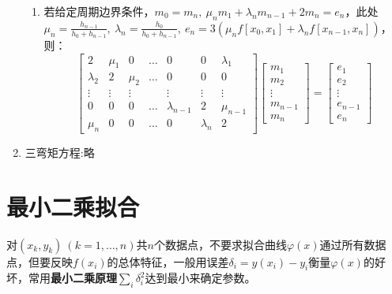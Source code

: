 \begin{enumerate}
\begin{enumerate}
	\item 若给定周期边界条件，$m_0 = m_n,\  \mu_n m_1 + \lambda_n m_{n-1} + 2m_n = e_n$，此处$\mu_n = \frac{h_{n-1}}{h_0 + h_{n-1}},\ \lambda_n = \frac{h_0}{h_0+h_{n-1}},\ e_n = 3(\mu_n f[x_0,x_1] + \lambda_n f[x_{n-1},x_n])$，则：
		\begin{equation}
			\begin{bmatrix}
			2 &\mu_1 &0 &\dots &0 &0 &\lambda_1 \\
			\lambda_2 &2 &\mu_2 &\dots &0 &0 &0 \\
			\vdots &\vdots &\vdots &\  &\vdots &\vdots &\vdots \\
			0 &0 &0 &\dots &\lambda_{n-1} &2 &\mu_{n-1} \\
			\mu_n &0 &0 &\dots &0 &\lambda_n &2
			\end{bmatrix}
			\begin{bmatrix}
			m_1\\ m_2\\ \vdots \\ m_{n-1}\\ m_{n}
			\end{bmatrix}
			=
			\begin{bmatrix}
			e_1\\ e_2\\ \vdots \\ e_{n-1}\\ e_{n}
			\end{bmatrix}
		\end{equation}
\end{enumerate}

\item 三弯矩方程:略
\end{enumerate}
\newpage


\section{最小二乘拟合}

对$(x_k,y_k)\ (k=1,\dots,n)$共$n$个数据点，不要求拟合曲线$\varphi(x)$通过所有数据点，但要反映$f(x_i)$的总体特征，一般用误差$\delta_i = y(x_i) - y_i$衡量$\varphi(x)$的好坏，常用\textbf{最小二乘原理}$\sum\limits_i\delta_i^2$达到最小来确定参数。

